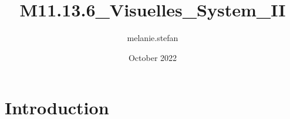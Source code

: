 \documentclass{article}
\title{M11.13.6_Visuelles_System_II}
\author{melanie.stefan }
\date{October 2022}
\begin{document}
\maketitle

\section{Introduction}
\end{document}
